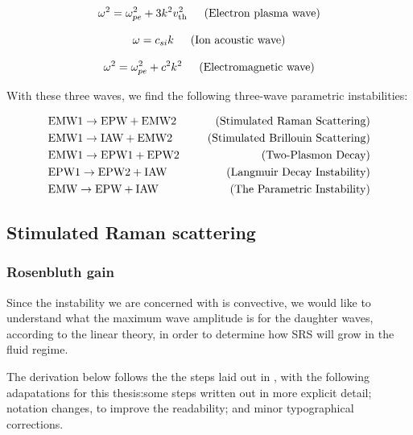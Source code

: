 \begin{equation}\label{eqn:bohm-gross}
	\omega^{2}=\omega_{p e}^{2}+3 k^{2} v_{\text{th}}^{2} \text{\,\,\,\,\,\,\,\,\,(Electron plasma wave)}
\end{equation}

\begin{equation}
 \omega =  c_{si} k \text{\,\,\,\,\,\,\,\,\,(Ion acoustic wave)}
\end{equation}

\begin{equation}
 \omega^{2}=\omega_{p e}^{2}+c^2k^{2} \text{\,\,\,\,\,\,\,\,\,(Electromagnetic wave)}
\end{equation}

With these three waves, we find the following three-wave parametric instabilities:

\begin{alignat*}{2}
	 	&\text{EMW1} \rightarrow \text{EPW} + \text{EMW2} &\text{\,\,\,\,\,\,\,\,\,(Stimulated Raman Scattering)}\\
	 	&\text{EMW1} \rightarrow \text{IAW} + \text{EMW2} &\text{\,\,\,\,\,\,\,\,\,(Stimulated Brillouin Scattering)}\\
	 	&\text{EMW1} \rightarrow \text{EPW1} + \text{EPW2} &\text{\,\,\,\,\,\,\,\,\,(Two-Plasmon Decay)}\\
	 	&\text{EPW1} \rightarrow \text{EPW2} + \text{IAW} &\text{\,\,\,\,\,\,\,\,\,(Langmuir Decay Instability)}\\
	 	&\text{EMW} \rightarrow \text{EPW} + \text{IAW} &\text{\,\,\,\,\,\,\,\,\,(The Parametric Instability)}\\
\end{alignat*}



\subsection{Stimulated Raman scattering}


\subsubsection{Rosenbluth gain}

Since the instability we are concerned with is convective, we would like to understand what the maximum wave amplitude is for the daughter waves, according to the linear theory, in order to determine how SRS will grow in the fluid regime.

The derivation below follows the the steps laid out in \citet{Nishikawa1976}, with the following adapatations for this thesis:some steps written out in more explicit detail; notation changes, to improve the readability; and minor typographical corrections. 

